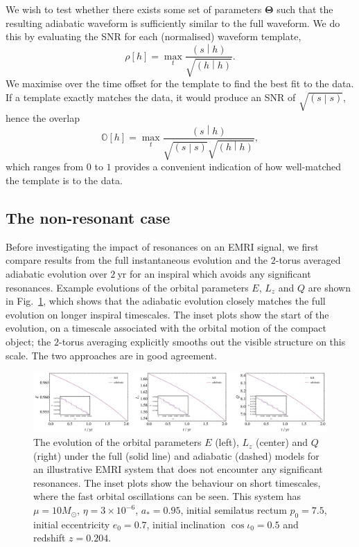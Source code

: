 \documentclass[aps,prd,amsfonts,amssymb,amsmath,nofootinbib,showpacs,superscriptaddress,twocolumn,floatfix]{revtex4-1}
\newcommand{\figref}[1]{Fig.~\ref{fig:#1}}
\newcommand{\overlap}[2]{\ensuremath{\left(#1\middle|#2\right)}}
\begin{document}
We wish to test whether there exists some set of parameters $\boldsymbol{\Theta}$ such that the resulting adiabatic waveform is sufficiently similar to the full waveform. We do this by evaluating the SNR for each (normalised) waveform template,
\begin{equation}
\rho\left[h\right] = \max_t \frac{\overlap{s}{h}}{\sqrt{\overlap{h}{h}}}.
\end{equation}
We maximise over the time offset for the template to find the best fit to the data. If a template exactly matches the data, it would produce an SNR of $\sqrt{\overlap{s}{s}}$, hence the overlap
\begin{equation}
\label{eq:overlap}
\mathbb{O}\left[h\right] = \max_t \frac{\overlap{s}{h}}{\sqrt{\overlap{s}{s}}\sqrt{\overlap{h}{h}}},
\end{equation}
which ranges from $0$ to $1$ provides a convenient indication of how well-matched the template is to the data.

\subsection{The non-resonant case}
\label{sec:nonres}

Before investigating the impact of resonances on an EMRI signal, we first compare results from the full instantaneous evolution and the $2$-torus averaged adiabatic evolution over $2~\mathrm{yr}$ for an inspiral which avoids any significant resonances. Example evolutions of the orbital parameters $E$, $L_z$ and $Q$ are shown in \figref{good-traj}, which shows that the adiabatic evolution closely matches the full evolution on longer inspiral timescales. The inset plots show the start of the evolution, on a timescale associated with the orbital motion of the compact object; the $2$-torus averaging explicitly smooths out the visible structure on this scale. The two approaches are in good agreement.

\begin{figure}
\centering
\includegraphics[width=\textwidth]{Fig_good_traj}
\caption{\label{fig:good-traj}The evolution of the orbital parameters $E$ (left), $L_z$ (center) and $Q$ (right) under the full (solid line) and adiabatic (dashed) models for an illustrative EMRI system that does not encounter any significant resonances. The inset plots show the behaviour on short timescales, where the fast orbital oscillations can be seen. This system has $\mu = 10 M_{\odot}$, $\eta = 3\times 10^{-6}$, $a_\ast=0.95$, initial semilatus rectum $p_0 = 7.5$, initial eccentricity $e_0 = 0.7$, initial inclination $\cos \iota_0 = 0.5$ and redshift $z=0.204$.}
\end{figure}
\end{document}
